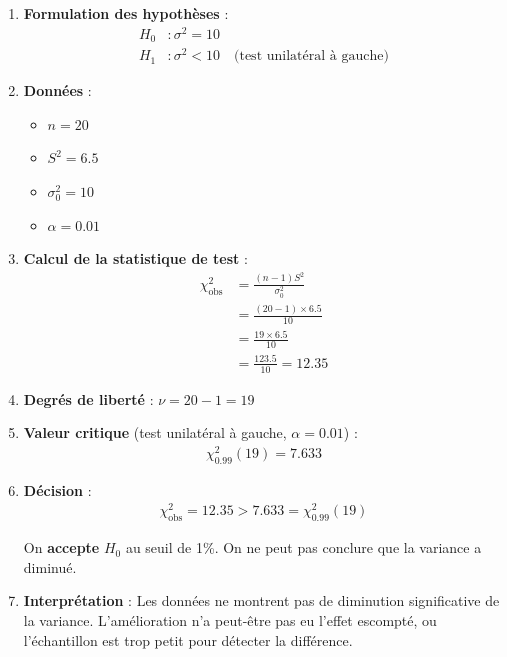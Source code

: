 \documentclass[11pt,a4paper]{article}
\newcommand{\chideux}{\chi^2}
\begin{document}
\begin{enumerate}
    \item \textbf{Formulation des hypothèses} :
    \begin{align*}
    H_0 &: \sigma^2 = 10 \\
    H_1 &: \sigma^2 < 10 \quad \text{(test unilatéral à gauche)}
    \end{align*}
    
    \item \textbf{Données} :
    \begin{itemize}
        \item $n = 20$
        \item $S^2 = 6.5$
        \item $\sigma_0^2 = 10$
        \item $\alpha = 0.01$
    \end{itemize}
    
    \item \textbf{Calcul de la statistique de test} :
    \begin{align*}
    \chideux_{\text{obs}} &= \frac{(n-1)S^2}{\sigma_0^2} \\
    &= \frac{(20-1) \times 6.5}{10} \\
    &= \frac{19 \times 6.5}{10} \\
    &= \frac{123.5}{10} = 12.35
    \end{align*}
    
    \item \textbf{Degrés de liberté} : $\nu = 20 - 1 = 19$
    
    \item \textbf{Valeur critique} (test unilatéral à gauche, $\alpha = 0.01$) :
    \begin{align*}
    \chideux_{0.99}(19) = 7.633
    \end{align*}
    
    \item \textbf{Décision} :
    \begin{align*}
    \chideux_{\text{obs}} = 12.35 > 7.633 = \chideux_{0.99}(19)
    \end{align*}
    
    On \textbf{accepte} $H_0$ au seuil de 1\%. On ne peut pas conclure que la variance a diminué.
    
    \item \textbf{Interprétation} : Les données ne montrent pas de diminution significative de la variance. L'amélioration n'a peut-être pas eu l'effet escompté, ou l'échantillon est trop petit pour détecter la différence.
\end{enumerate}
\end{document}
